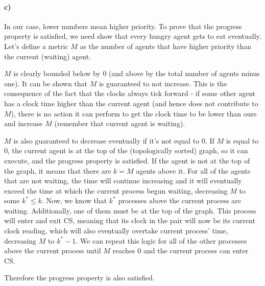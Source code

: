 \documentclass[10pt,letter]{article}
\begin{document}
\paragraph{c)} In our case, lower numbers mean higher priority. To prove that the progress property is satisfied, we need show that every hungry agent gets to eat eventually. Let's define a metric $M$ as the number of agents that have higher priority than the current (waiting) agent.

$M$ is clearly bounded below by $0$ (and above by the total number of agents minus one). It can be shown that $M$ is guaranteed to not increase. This is the consequence of the fact that the clocks always tick forward - if some other agent has a clock time higher than the current agent (and hence does not contribute to $M$), there is no action it can perform to get the clock time to be lower than ours and increase $M$ (remember that current agent is waiting).

$M$ is also guaranteed to decrease eventually if it's not equal to $0$. If $M$ is equal to $0$, the current agent is at the top of the (topologically sorted) graph, so it can execute, and the progress property is satisfied. If the agent is not at the top of the graph, it means that there are $k = M$ agents above it. For all of the agents that are not waiting, the time will continue increasing and it will eventually exceed the time at which the current process begun waiting, decreasing $M$ to some $k^* \leq k$. Now, we know that $k^*$ processes above the current process are waiting. Additionally, one of them must be at the top of the graph. This process will enter and exit CS, meaning that its clock in the pair will now be its current clock reading, which will also eventually overtake current process' time, decreasing $M$ to $k^* - 1$. We can repeat this logic for all of the other processes above the current process until $M$ reaches $0$ and the current process can enter CS.

Therefore the progress property is also satisfied.
\end{document}
